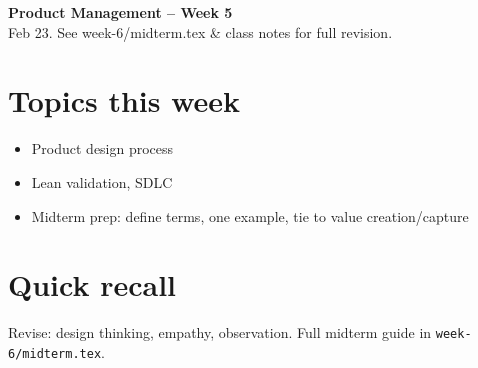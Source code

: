 \documentclass[10pt,a4paper]{article}
\begin{document}
\begin{center}
{\large\bfseries\color{eublue} Product Management -- Week 5}\\[0.2em]
\footnotesize Feb 23. See week-6/midterm.tex \& class notes for full revision.
\end{center}\vspace{0.5em}

\section*{\color{eublue}Topics this week}
\begin{itemize}
\item Product design process
\item Lean validation, SDLC
\item Midterm prep: define terms, one example, tie to value creation/capture
\end{itemize}

\section*{Quick recall}
Revise: design thinking, empathy, observation. Full midterm guide in \texttt{week-6/midterm.tex}.
\end{document}
